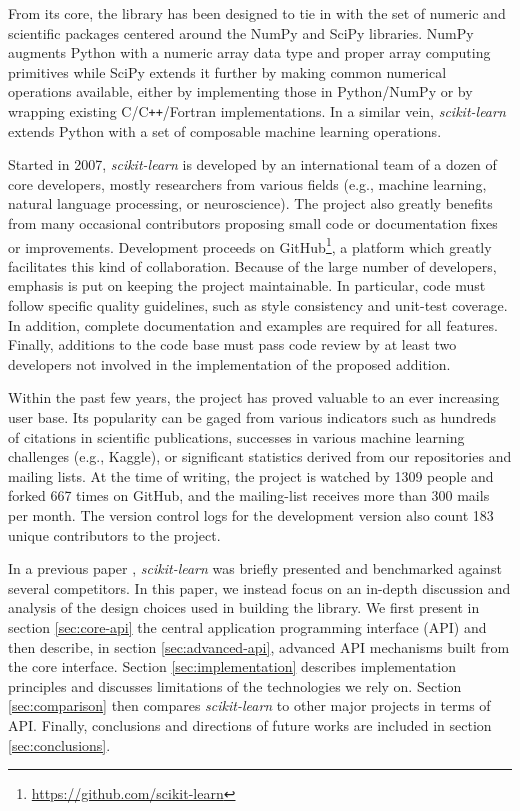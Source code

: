 \documentclass{llncs}
\newcommand{\sklearn}{\textit{scikit-learn}\xspace}
\begin{document}
From its core, the library has been designed to tie in with the set of numeric
and scientific packages centered around the NumPy and SciPy libraries. NumPy
\citep{vanderwalt2011} augments Python with a numeric array data type and proper
array computing primitives while SciPy \citep{varoquaux2013scipy} extends it
further by making common numerical operations available, either by implementing
those in Python/NumPy or by wrapping existing C/C{}\verb!++!/Fortran
implementations. In a similar vein, \sklearn extends Python with a set of
composable machine learning operations.

Started in 2007, \sklearn is developed by an international team of a dozen of
core developers, mostly researchers from various fields (e.g., machine learning,
natural language processing, or neuroscience). The project also greatly benefits
from many occasional contributors proposing small code or documentation fixes or
improvements. Development proceeds on GitHub\footnote{\url{https://github.com/scikit-learn}},
a platform which greatly facilitates this kind of
collaboration. Because of the large number of developers, emphasis is
put on keeping the project maintainable. In particular, code must follow
specific quality guidelines, such as style consistency and unit-test coverage.
In addition, complete documentation and examples are required for all features.
Finally, additions to the code base must pass code review by at least two
developers not involved in the implementation of the proposed addition.

Within the past few years, the project has proved valuable to an ever increasing
user base. Its popularity can be gaged from various indicators such as hundreds
of citations in scientific publications, successes in various machine learning
challenges (e.g., Kaggle), or significant statistics derived from our
repositories and mailing lists.  At the time of writing, the project is watched
by 1309 people and forked 667 times on GitHub, and the mailing-list receives
more than 300 mails per month. The version control logs for the development
version
also count 183 unique contributors to the project.

In a previous paper \citep{pedregosa2011}, \sklearn was briefly presented and
benchmarked against several competitors. In this paper, we instead focus on an
in-depth discussion and analysis of the design choices used in building the
library. We first present in section \ref{sec:core-api} the central application
programming interface (API) and then describe, in section \ref{sec:advanced-api},
advanced API mechanisms built from the core interface. Section
\ref{sec:implementation} describes implementation principles and discusses
limitations of the technologies we rely on. Section \ref{sec:comparison} then
compares \emph{scikit-learn} to other major projects in terms of API. Finally,
conclusions and directions of future works are included in section
\ref{sec:conclusions}.
\end{document}
